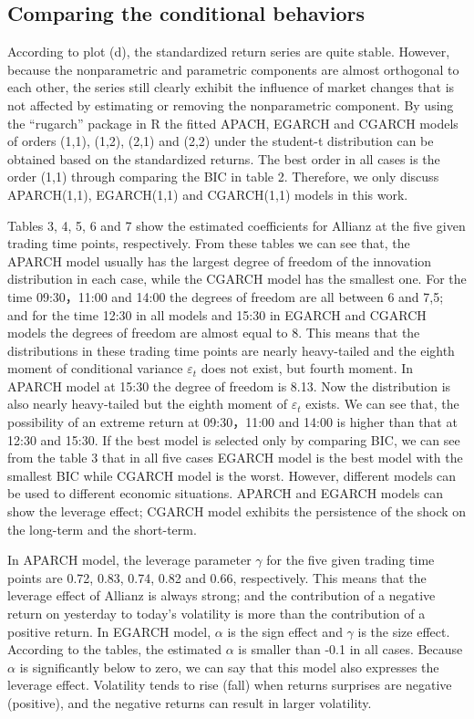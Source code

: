 \subsection{Comparing the conditional behaviors}

According to plot (d), the standardized return series are quite stable. However, because the nonparametric and parametric components are almost orthogonal to each other, the series still clearly exhibit the influence of market changes that is not affected by estimating or removing the nonparametric component.
By using the ``rugarch'' package in R the fitted APACH, EGARCH and CGARCH models of orders (1,1), (1,2), (2,1) and (2,2) under the student-t distribution can be obtained based on the standardized returns. The best order in all cases is the order (1,1) through comparing the BIC in table 2. Therefore, we only discuss APARCH(1,1), EGARCH(1,1) and CGARCH(1,1) models in this work.

Tables 3, 4, 5, 6 and 7 show the estimated coefficients for Allianz at the five given trading time points, respectively. From these tables we can see that, the APARCH model usually has the largest degree of freedom of the innovation distribution in each case, while the CGARCH model has the smallest one. For the time 09:30，11:00 and 14:00 the degrees of freedom are all between 6 and 7,5; and for the time 12:30 in all models and 15:30 in EGARCH and CGARCH models the degrees of freedom are almost equal to 8. This means that the distributions in these trading time points are nearly heavy-tailed and the eighth moment of conditional variance $\varepsilon_t$  does not exist, but fourth moment. In APARCH model at 15:30 the degree of freedom is 8.13. Now the distribution is also nearly heavy-tailed but the eighth moment of  $\varepsilon_t$ exists. We can see that, the possibility of an extreme return at 09:30，11:00 and 14:00 is higher than that at 12:30 and 15:30.
If the best model is selected only by comparing BIC, we can see from the table 3 that in all five cases EGARCH model is the best model with the smallest BIC while CGARCH model is the worst. However, different models can be used to different economic situations. APARCH and EGARCH models can show the leverage effect; CGARCH model exhibits the persistence of the shock on the long-term and the short-term.

In APARCH model, the leverage parameter $\gamma$  for the five given trading time points are 0.72, 0.83, 0.74, 0.82 and 0.66, respectively. This means that the leverage effect of Allianz is always strong; and the contribution of a negative return on yesterday to today’s volatility is more than the contribution of a positive return. In EGARCH model,  $\alpha$ is the sign effect and $\gamma$  is the size effect. According to the tables, the estimated $\alpha$ is smaller than -0.1 in all cases. Because $\alpha$  is significantly below to zero, we can say that this model also expresses the leverage effect. Volatility tends to rise (fall) when returns surprises are negative (positive), and the negative returns can result in larger volatility.

